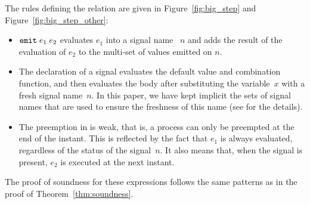 \documentclass[9pt]{sigplanconf}
\begin{document}
The rules defining the relation are given in Figure~\ref{fig:big_step} and Figure~\ref{fig:big_step_other}:
\begin{itemize}
\item $\mathtt{emit}\; e_1\; e_2$ evaluates $e_1$ into a signal name~ $n$ and adds the result of the evaluation of $e_2$ to the multi-set of values emitted on $n$.
\item The declaration of a signal evaluates the default value and combination function, and then evaluates the body after substituting the variable~$x$ with a fresh signal name~$n$. In this paper, we have kept implicit the sets of signal names that are used to ensure the freshness of this name (see \cite{Mandel:2005} for the details).
\item The preemption in \rml is weak, that is, a process can only be preempted at the end of the instant. This is reflected by the fact that $e_1$ is always evaluated, regardless of the status of the signal~$n$. It also means that, when the signal is present, $e_2$ is executed at the next instant.
\end{itemize}

The proof of soundness for these expressions follows the same patterns as in the proof of Theorem~\ref{thm:soundness}.
\end{document}
